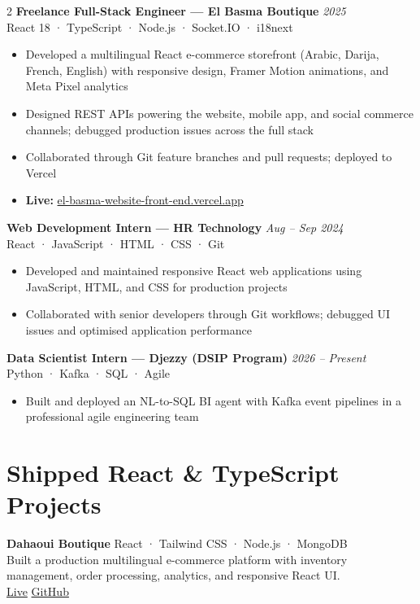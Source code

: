 \documentclass[8.5pt, letterpaper]{extarticle}
\newcommand{\role}[3]{%
  {\bfseries\small #1} \hfill {\small\color{muted}\textit{#2}}\\[-1pt]
  {\small\color{blue} #3}\vspace{2pt}%
}
\begin{document}
\begin{multicols}{2}
\role{Freelance Full-Stack Engineer — El Basma Boutique}{2025}{React 18 · TypeScript · Node.js · Socket.IO · i18next}
\begin{itemize}
  \item Developed a multilingual React e-commerce storefront (Arabic, Darija, French, English) with responsive design, Framer Motion animations, and Meta Pixel analytics
  \item Designed REST APIs powering the website, mobile app, and social commerce channels; debugged production issues across the full stack
  \item Collaborated through Git feature branches and pull requests; deployed to Vercel
  \item \textbf{Live:} \href{https://el-basma-website-front-end.vercel.app/}{\color{blue}el-basma-website-front-end.vercel.app}
\end{itemize}
\vspace{3pt}

\role{Web Development Intern — HR Technology}{Aug – Sep 2024}{React · JavaScript · HTML · CSS · Git}
\begin{itemize}
  \item Developed and maintained responsive React web applications using JavaScript, HTML, and CSS for production projects
  \item Collaborated with senior developers through Git workflows; debugged UI issues and optimised application performance
\end{itemize}
\vspace{3pt}

\role{Data Scientist Intern — Djezzy (DSIP Program)}{2026 – Present}{Python · Kafka · SQL · Agile}
\begin{itemize}
  \item Built and deployed an NL-to-SQL BI agent with Kafka event pipelines in a professional agile engineering team
\end{itemize}

\vspace{4pt}

\section{Shipped React \& TypeScript Projects}

{\bfseries\small Dahaoui Boutique} \hfill {\small React · Tailwind CSS · Node.js · MongoDB}\\
Built a production multilingual e-commerce platform with inventory management, order processing, analytics, and responsive React UI.\\[-1pt]
{\small {}\;\href{https://dahaoui-boutiquee.vercel.app/}{\color{blue}Live}
\;\textbullet\; \;\href{https://github.com/Samir-Guenchi/dahaoui_boutique}{\color{blue}GitHub}}
\vspace{3pt}


\end{multicols}
\end{document}

